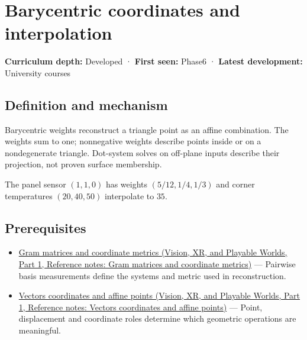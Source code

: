 \hypertarget{appendix-02b9d9a81dca}{}\label{referencestart:appendix-02b9d9a81dca}
\section{Barycentric coordinates and interpolation}\label{appendix-02b9d9a81dca-barycentric-coordinates-and-interpolation}

\hypertarget{appendix-02b9d9a81dca-barycentric-coordinates-and-interpolation}{}

\textbf{Curriculum depth:} Developed · \textbf{First seen:} Phase6 · \textbf{Latest development:} University courses

\begin{allmightroledefinition}

\subsection{Definition and mechanism}\label{appendix-02b9d9a81dca-definition-and-mechanism}

\hypertarget{appendix-02b9d9a81dca-definition-and-mechanism}{}

Barycentric weights reconstruct a triangle point as an affine combination. The weights sum to one; nonnegative weights describe points inside or on a nondegenerate triangle. Dot-system solves on off-plane inputs describe their projection, not proven surface membership.

\end{allmightroledefinition}

The panel sensor \((1,1,0)\) has weights \((5/12,1/4,1/3)\) and corner temperatures \((20,40,50)\) interpolate to \(35\).

\subsection{Prerequisites}\label{appendix-02b9d9a81dca-prerequisites}

\hypertarget{appendix-02b9d9a81dca-prerequisites}{}

\begin{itemize}
\tightlist
\item
  \href{../07-Vision-XR-and-Playable-Worlds-P01/main.pdf\#nameddest=appendix-3b863809f82a}{Gram matrices and coordinate metrics (Vision, XR, and Playable Worlds, Part 1, Reference notes: Gram matrices and coordinate metrics)} --- Pairwise basis measurements define the systems and metric used in reconstruction.
\item
  \href{../07-Vision-XR-and-Playable-Worlds-P01/main.pdf\#nameddest=appendix-0659864c0aa3}{Vectors coordinates and affine points (Vision, XR, and Playable Worlds, Part 1, Reference notes: Vectors coordinates and affine points)} --- Point, displacement and coordinate roles determine which geometric operations are meaningful.
\end{itemize}

